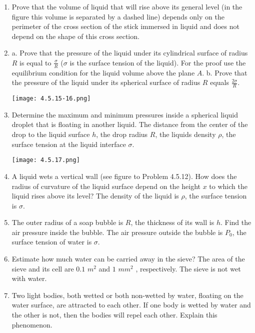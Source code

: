 \documentclass{article}
\begin{document}
\begin{enumerate}[label=4.5.\arabic*]
\item Prove that the volume of liquid that will rise above its general level (in the figure this volume is separated by a dashed line) depends only on the perimeter of the cross section of the stick immersed in liquid and does not depend on the shape of this cross section.   

\item a. Prove that the pressure of the liquid under its cylindrical surface of radius $R$ is equal to $\frac{\sigma}{R}$ ($\sigma$ is the surface tension of the liquid). For the proof use the equilibrium condition for the liquid volume above the plane $A$. 
b. Prove that the pressure of the liquid under its spherical surface of radius $R$ equals $\frac{2 \sigma}{R}$.  

\begin{center}
    \texttt{[image: 4.5.15-16.png]}
\end{center}

\item Determine the maximum and minimum pressures inside a spherical liquid droplet that is floating in another liquid. The distance from the center of the drop to the liquid surface $h$, the drop radius $R$, the liquids density $\rho$, the surface tension at the liquid interface $\sigma$.

\begin{center}
    \texttt{[image: 4.5.17.png]}
\end{center}

\item A liquid wets a vertical wall (see figure to Problem 4.5.12). How does the radius of curvature of the liquid surface depend on the height $x$ to which the liquid rises above its level? The density of the liquid is $\rho$, the surface tension is $\sigma$.

\item The outer radius of a soap bubble is $R$, the thickness of its wall is $h$. Find the air pressure inside the bubble. The air pressure outside the bubble is $P_0$, the surface tension of water is $\sigma$.

\item Estimate how much water can be carried away in the sieve? The area of the sieve and its cell are $0.1$ $m^2$ and $1$ $mm^2$ , respectively. The sieve is not wet with water.

\item Two light bodies, both wetted or both non-wetted by water, floating on the water surface, are attracted to each other. If one body is wetted by water and the other is not, then the bodies will repel each other. Explain this phenomenon.  


\end{enumerate}
\end{document}
